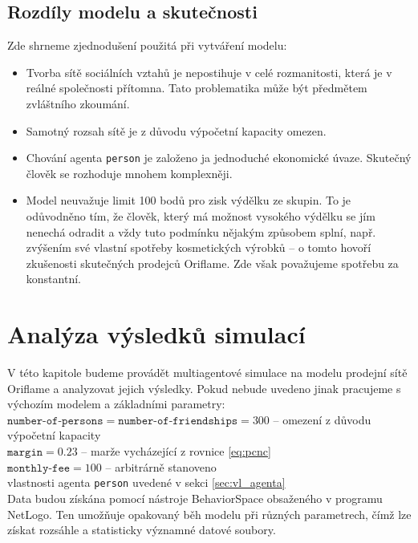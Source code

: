 \documentclass[a4wide,12pt]{report}
\begin{document}
\section{Rozdíly modelu a skutečnosti}
Zde shrneme zjednodušení použitá při vytváření modelu:
\begin{itemize}
\item Tvorba sítě sociálních vztahů je nepostihuje v celé rozmanitosti, která je v reálné společnosti přítomna. Tato problematika může být předmětem zvláštního zkoumání.
\item Samotný rozsah sítě je z důvodu výpočetní kapacity omezen.
\item Chování agenta \texttt{person} je založeno ja jednoduché ekonomické úvaze. Skutečný člověk se rozhoduje mnohem komplexněji.
\item Model neuvažuje limit 100 bodů pro zisk výdělku ze skupin. To je odůvodněno tím, že člověk, který má možnost vysokého výdělku se jím nenechá odradit a vždy tuto podmínku nějakým způsobem splní, např. zvýšením své vlastní spotřeby kosmetických výrobků -- o tomto hovoří zkušenosti skutečných prodejců Oriflame. Zde však považujeme spotřebu za konstantní.
\end{itemize}
%
%
%
\chapter{Analýza výsledků simulací}
V této kapitole budeme provádět multiagentové simulace na modelu prodejní sítě Oriflame a analyzovat jejich výsledky. Pokud nebude uvedeno jinak pracujeme s výchozím modelem a základními parametry:\\[3mm]
$\texttt{number-of-persons}=\texttt{number-of-friendships}=300$ -- omezení z důvodu výpočetní kapacity\\
$\texttt{margin}=0.23$ -- marže vycházející z rovnice \ref{eq:pcnc}\\
$\texttt{monthly-fee}=100$ -- arbitrárně stanoveno\\
vlastnosti agenta \texttt{person} uvedené v sekci \ref{sec:vl_agenta}\\[3mm]
Data budou získána pomocí nástroje BehaviorSpace obsaženého v programu NetLogo. Ten umožňuje opakovaný běh modelu při různých parametrech, čímž lze získat rozsáhle a statisticky významné datové soubory.
\end{document}
